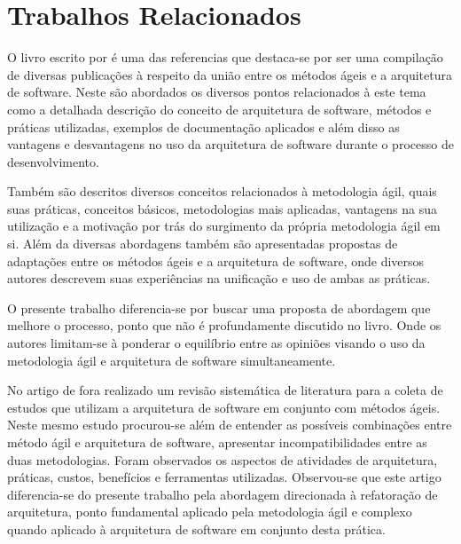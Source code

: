 \chapter{Trabalhos Relacionados}

O livro escrito por \cite{babar2013agile} é uma das referencias que destaca-se por ser uma compilação de diversas publicações à respeito da união entre os métodos ágeis e a arquitetura de software. 
Neste são abordados os diversos pontos relacionados à este tema como a detalhada descrição do conceito de arquitetura de software, métodos e práticas utilizadas, exemplos de documentação aplicados e além disso as vantagens e desvantagens no uso da arquitetura de software durante o processo de desenvolvimento.

Também são descritos diversos conceitos relacionados à metodologia ágil, quais suas práticas, 
conceitos básicos, metodologias mais aplicadas, vantagens na sua utilização e a motivação por trás do surgimento da própria metodologia ágil em si.
Além da diversas abordagens também são apresentadas propostas de adaptações entre os métodos ágeis e a arquitetura de software, onde diversos autores descrevem suas experiências na unificação e uso de ambas as práticas.

O presente trabalho diferencia-se por buscar uma proposta de abordagem que melhore o processo, ponto que não é profundamente discutido no livro. Onde os autores limitam-se à ponderar o equilíbrio entre as opiniões visando o uso da metodologia ágil e arquitetura de software simultaneamente.

No artigo de \cite{yang2016systematic} fora realizado um revisão sistemática de literatura para a coleta de estudos que utilizam a arquitetura de software em conjunto com métodos ágeis.
Neste mesmo estudo procurou-se além de entender as possíveis combinações entre método ágil e arquitetura de software, apresentar incompatibilidades entre as duas metodologias. Foram observados os aspectos de atividades de arquitetura, práticas, custos, benefícios e ferramentas utilizadas.
Observou-se que este artigo diferencia-se do presente trabalho pela abordagem direcionada à refatoração de arquitetura, ponto fundamental aplicado pela metodologia ágil e complexo quando aplicado à arquitetura de software em conjunto desta prática.

